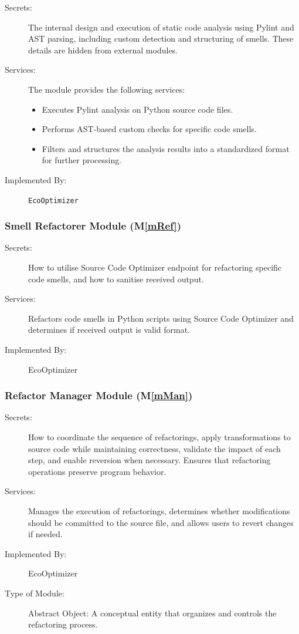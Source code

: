 \documentclass[12pt, titlepage]{article}
\newcommand{\mref}[1]{M\ref{#1}}
\begin{document}
\begin{description}
\item[Secrets:] The internal design and execution of static code analysis using Pylint and AST parsing, including custom detection and structuring of smells. These details are hidden from external modules.
\item[Services:] The module provides the following services:
  \begin{itemize}
    \item Executes Pylint analysis on Python source code files.
    \item Performs AST-based custom checks for specific code smells.
    \item Filters and structures the analysis results into a standardized format for further processing.
  \end{itemize}
\item[Implemented By:] \texttt{EcoOptimizer}
\end{description}


\subsubsection{Smell Refactorer Module (\mref{mRef})}


\begin{description}
    \item[Secrets:] How to utilise Source Code Optimizer endpoint for refactoring specific code smells, and how to sanitise received output.
    \item[Services:] Refactors code smells in Python scripts using Source Code Optimizer and determines if received output is valid format.
    \item[Implemented By:] EcoOptimizer
\end{description}


\subsubsection{Refactor Manager Module (\mref{mMan})}

\begin{description}
    \item[Secrets:] How to coordinate the sequence of refactorings, apply transformations to source code while maintaining correctness, validate the impact of each step, and enable reversion when necessary. Ensures that refactoring operations preserve program behavior.

    \item[Services:] Manages the execution of refactorings, determines whether modifications should be committed to the source file, and allows users to revert changes if needed.

    \item[Implemented By:] EcoOptimizer
    \item[Type of Module:] Abstract Object: A conceptual entity that organizes and controls the refactoring process.
\end{description}
\end{document}
